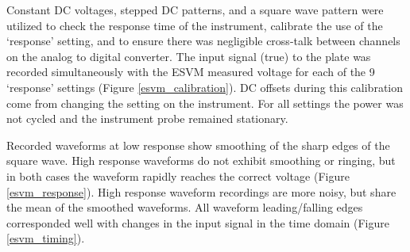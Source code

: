 Constant DC voltages, stepped DC patterns, and a square wave pattern were utilized to check the response time of the instrument, calibrate the use of the `response' setting, and to ensure there was negligible cross-talk between channels on the analog to digital converter.  The input signal (true) to the plate was recorded simultaneously with the ESVM measured voltage for each of the 9 `response' settings (Figure \ref{esvm_calibration}).  DC offsets during this calibration come from changing the setting on the instrument.  For all settings the power was not cycled and the instrument probe remained stationary.  

Recorded waveforms at low response show smoothing of the sharp edges of the square wave.  High response waveforms do not exhibit smoothing or ringing, but in both cases the waveform rapidly reaches the correct voltage (Figure \ref{esvm_response}).  High response waveform recordings are more noisy, but share the mean of the smoothed waveforms.  All waveform leading/falling edges corresponded well with changes in the input signal in the time domain (Figure \ref{esvm_timing}).

